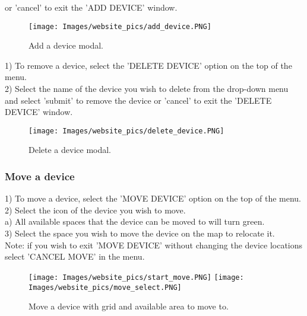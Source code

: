 \documentclass[onecolumn, draftclsnofoot,10pt, compsoc]{IEEEtran}
\begin{document}
\hspace*{1cm} or 'cancel' to exit the 'ADD DEVICE' window. 
\begin{figure}[h]
    \centering
    \texttt{[image: Images/website\_pics/add\_device.PNG]} 
    \caption{Add a device modal.}
\label{fig1}
\end{figure}
\newpage
{}
1) To remove a device, select the 'DELETE DEVICE' option on the top of the menu. \\
2) Select the name of the device you wish to delete from the drop-down menu and select 'submit' to remove the device or 'cancel' to exit the 'DELETE DEVICE' window.
\begin{figure}[h]
    \centering
    \texttt{[image: Images/website\_pics/delete\_device.PNG]} 
    \caption{Delete a device modal.}
\label{fig1}
\end{figure}
\subsubsection{Move a device}
1) To move a device, select the 'MOVE DEVICE' option on the top of the menu. \\
2) Select the icon of the device you wish to move. \\
\hspace*{1cm} a) All available spaces that the device can be moved to will turn green. \\
3) Select the space you wish to move the device on the map to relocate it.
\\
\hspace*{1cm} Note: if you wish to exit 'MOVE DEVICE' without changing the device locations \\
     \hspace*{1.5cm} select 'CANCEL MOVE' in the menu.
\begin{figure}[h]%
    \centering
    \texttt{[image: Images/website\_pics/start\_move.PNG]}%
    \qquad
    \texttt{[image: Images/website\_pics/move\_select.PNG]}
    \caption{Move a device with grid and available area to move to.}
\end{figure}
\newpage
\end{document}
